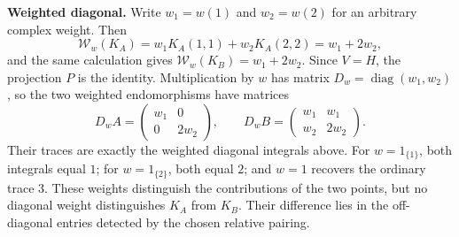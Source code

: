 \begin{example}
\textbf{Weighted diagonal.} Write $w_1=w(1)$ and $w_2=w(2)$ for an arbitrary complex weight. Then
\[
\mathcal W_w(K_A)=w_1K_A(1,1)+w_2K_A(2,2)=w_1+2w_2,
\]
and the same calculation gives $\mathcal W_w(K_B)=w_1+2w_2$. Since $V=H$, the projection $P$ is the identity. Multiplication by $w$ has matrix $D_w=\operatorname{diag}(w_1,w_2)$, so the two weighted endomorphisms have matrices
\[
D_wA=\begin{pmatrix}w_1&0\\0&2w_2\end{pmatrix},
\qquad
D_wB=\begin{pmatrix}w_1&w_1\\w_2&2w_2\end{pmatrix}.
\]
Their traces are exactly the weighted diagonal integrals above. For $w=1_{\{1\}}$, both integrals equal $1$; for $w=1_{\{2\}}$, both equal $2$; and $w=1$ recovers the ordinary trace $3$. These weights distinguish the contributions of the two points, but no diagonal weight distinguishes $K_A$ from $K_B$. Their difference lies in the off-diagonal entries detected by the chosen relative pairing.
\end{example}
